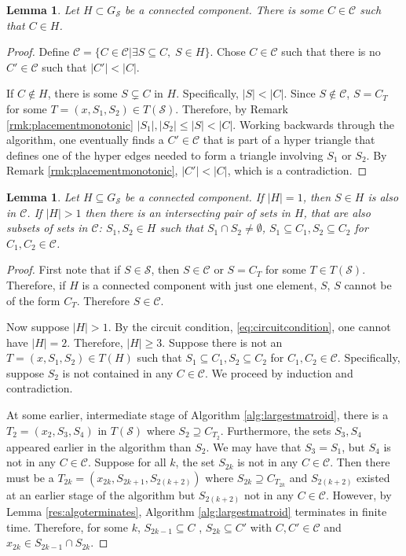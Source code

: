 \documentclass[11pt]{article}
\newcommand{\sC}{\mathscr{C}}
\newcommand{\cC}{\mathcal{C}}
\newcommand{\sS}{\mathscr{S}}
\newtheorem{lem}[thm]{Lemma}
\theoremstyle{remark}
\theoremstyle{definition}
\begin{document}
\begin{lem}\label{res:orginaledgeineachcc}
    Let $H \subset G_\sS$ be a connected component. There is some $C \in \sC$ such that $C \in H$.
\end{lem}
\begin{proof}
    Define $\cC  = \{C \in \sC | \exists S \subseteq C, \; S\in  H\}$. Chose $C \in \cC$ such that there is no $C' \in \cC$ such that $|C'| < |C|$.

    If $C \not \in H$, there is some $S \subsetneq C$ in $H$. Specifically, $|S| < |C|$. Since $S \not \in \sC$, $S = C_T$ for some $T = (x, S_1, S_2) \in T(\sS)$. Therefore, by Remark \ref{rmk:placementmonotonic} $|S_1|, |S_2| \leq |S| < |C|$. Working backwards through the algorithm, one eventually finds a $C' \in \sC$ that is part of a hyper triangle that defines one of the hyper edges needed to form a triangle involving $S_1$ or $S_2$. By Remark \ref{rmk:placementmonotonic}, $|C'| < |C|$, which is a contradiction.
\end{proof}


\begin{lem} \label{res:orginaledgesubsetineachcc}
    Let $H \subseteq G_\sS$ be a connected component. If $|H| = 1$, then $S \in H$ is also in $\sC$. If $|H| >1$ then there is an intersecting pair of sets in $H$, that are also subsets of sets in $\sC$: $S_1, S_2 \in H$ such that $S_1 \cap S_2 \neq \emptyset$, $S_1 \subseteq C_1, S_2\subseteq C_2$ for $C_1, C_2\in \sC$.
\end{lem}
\begin{proof}
    First note that if $S \in \sS$, then $S \in \sC$ or $S = C_T$ for some $T \in T(\sS)$. Therefore, if $H$ is a connected component with just one element, $S$, $S$ cannot be of the form $C_T$. Therefore $S \in \sC$.

    Now suppose $|H| >1$. By the circuit condition, \eqref{eq:circuitcondition}, one cannot have $|H| = 2$. Therefore,  $|H| \geq 3$. Suppose there is not an $T = (x, S_1, S_2) \in T(H)$ such that $S_1 \subseteq C_1, S_2\subseteq C_2$ for $C_1, C_2\in \sC$. Specifically, suppose $S_2$ is not contained in any $C \in \sC$. We proceed by induction and contradiction. 
    
    At some earlier, intermediate stage of Algorithm \ref{alg:largestmatroid}, there is a $T_2 = (x_2, S_3, S_4)$ in $T(\sS)$ where $S_2  \supseteq C_{T_2}$. Furthermore, the sets $S_3, S_4$ appeared earlier in the algorithm than $S_2$. We may have that $S_3 = S_1$, but $S_4$ is  not in any $C \in \sC$. Suppose for all $k$, the set $S_{2k}$ is not in any $C \in \sC$. Then there must be a $T_{2k} = (x_{2k}, S_{2k+1}, S_{2(k+2)})$ where $S_{2k} \supseteq C_{T_{2k}}$ and $S_{2(k+2)}$ existed at an earlier stage of the algorithm but $S_{2(k+2)}$ not in any $C \in \sC$. However, by Lemma \ref{res:algoterminates}, Algorithm \ref{alg:largestmatroid} terminates in finite time. Therefore, for some $k$, $S_{2k-1} \subseteq C$ , $S_{2k} \subseteq C'$ with  $C, C'\in \sC$ and $x_{2k} \in S_{2k-1} \cap S_{2k} $. 

\end{proof}
\end{document}

